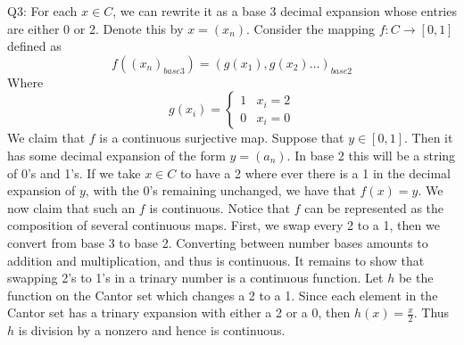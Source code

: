 \documentclass[letterpaper]{article}
\begin{document}
\noindent Q3: For each $x\in C$, we can rewrite it as a base 3 decimal expansion whose entries are either 0 or 2. Denote this by $x=(x_n)$. 
Consider the mapping $f: C \to [0,1]$ defined as $$f((x_n)_{base 3}) = (g(x_1),g(x_2) \dots)_{base 2} $$ Where $$g(x_i) =  \begin{cases} 
    1 & x_i = 2 \\
    0 & x_i = 0
 \end{cases} $$ 
We claim that $f$ is a continuous surjective map. Suppose that $y\in[0,1]$. Then it has some decimal expansion of the form $y=(a_n)$.
In base 2 this will be a string of 0's and 1's. If we take $x\in C$ to have a 2 where ever there is a 1 in the decimal expansion of $y$, with the 0's remaining unchanged, we have that $f(x)=y$.
We now claim that such an $f$ is continuous. Notice that $f$ can be represented as the composition of several continuous maps. First, we swap every 2 to a 1, then we convert from base 3 to base 2. 
Converting between number bases amounts to addition and multiplication, and thus is continuous. It remains to show that swapping 2's to 1's in a trinary number is a continuous function. Let $h$ be the function  on the Cantor set which changes a 2 to a 1. Since each element in the Cantor set has a trinary expansion with either a 2 or a 0, then 
$h(x)=\frac{x}{2}$. Thus $h$ is division by a nonzero and hence is continuous. 
\end{document}
